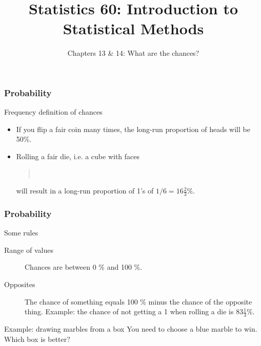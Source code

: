 \documentclass[handout]{beamer}
\title{Statistics 60: Introduction to Statistical Methods}
\subtitle{Chapters 13 \& 14: What are the chances?}
\author{}%
\begin{document}
   \begin{frame}
   \titlepage
   \end{frame}


   \begin{frame} \frametitle{Probability}

   \begin{block}
   {Frequency definition of chances}
   \begin{itemize}
   \item If you flip a fair coin many times, the long-run
   proportion of heads will be 50\%.

   \item Rolling a fair die, i.e. a cube with faces
   \begin{quote}
    \  \  \  \  \ 
   \end{quote}
   will result in a long-run proportion of 1's of $1/6=16 \frac{2}{3}\%$.

   \end{itemize}
   \end{block}
   \end{frame}


   \begin{frame} \frametitle{Probability}

   \begin{block}
   {Some rules}
   \begin{description}
     \item[Range of values] Chances are between 0 \% and 100 \%.
     \item[Opposites] The chance of something equals 100 \% minus
     the chance of the opposite thing. Example: the chance
     of not getting a 1 when rolling a die is $83 \frac{1}{3} \%$.
   \end{description}
   \end{block}

   \begin{block}
   {Example: drawing marbles from a box}
   You need to choose a blue marble to win.
   Which box is better?
   \end{block}
   \end{frame}

\end{document}
